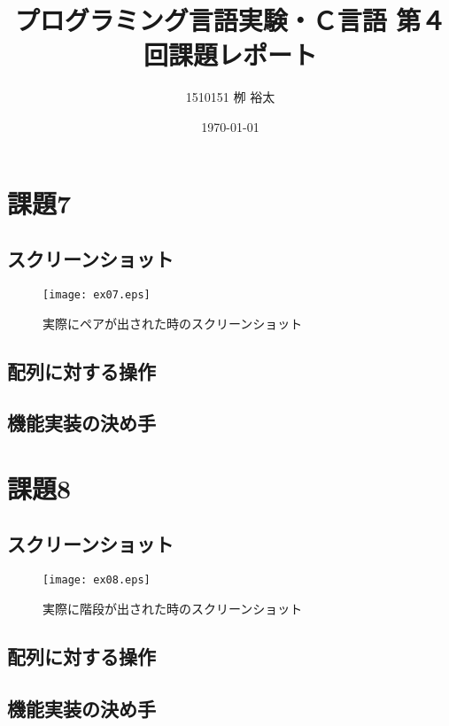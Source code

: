 \documentclass[11pt,a4paper, uplatex]{jsarticle}
\title{プログラミング言語実験・Ｃ言語 第４回課題レポート}
\author{1510151  栁 裕太}
\date{\today}
\begin{document}
\maketitle
\section{課題7}
%
\subsection{スクリーンショット}

\begin{figure}[h]
  \centering
  \caption{実際にペアが出された時のスクリーンショット}
  \texttt{[image: ex07.eps]}
\end{figure}

\subsection{配列に対する操作}

\subsection{機能実装の決め手}

\section{課題8}
\subsection{スクリーンショット}
\begin{figure}[h]
  \centering
  \caption{実際に階段が出された時のスクリーンショット}
  \texttt{[image: ex08.eps]}
\end{figure}
\subsection{配列に対する操作}
\subsection{機能実装の決め手}
%
%
\end{document}
